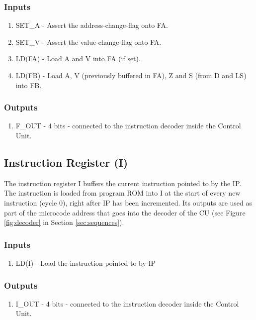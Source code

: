 \subsubsection*{Inputs}
\begin{enumerate}
\itemsep0em 
\item SET\_A - Assert the address-change-flag onto FA.
\item SET\_V - Assert the value-change-flag onto FA.
\item LD(FA) - Load A and V into FA (if set).
\item LD(FB) - Load A, V (previously buffered in FA), Z and S (from D and LS) into FB. 
\end{enumerate}

\subsubsection*{Outputs}
\begin{enumerate}
\itemsep0em 
\item F\_OUT - 4 bits - connected to the instruction decoder inside the Control Unit.
\end{enumerate}


\subsection{Instruction Register (I)} \label{sec:architecture:i}
The instruction register I buffers the current instruction pointed to by the IP. The instruction is loaded from program ROM into I at the start of every new instruction (cycle 0), right after IP has been incremented. Its outputs are used as part of the microcode address that goes into the decoder of the CU (see Figure \ref{fig:decoder} in Section \ref{sec:sequences}).


\subsubsection*{Inputs}
\begin{enumerate}
\itemsep0em 
\item LD(I) - Load the instruction pointed to by IP
\end{enumerate}

\subsubsection*{Outputs}
\begin{enumerate}
\itemsep0em 
\item I\_OUT - 4 bits - connected to the instruction decoder inside the Control Unit.
\end{enumerate}


